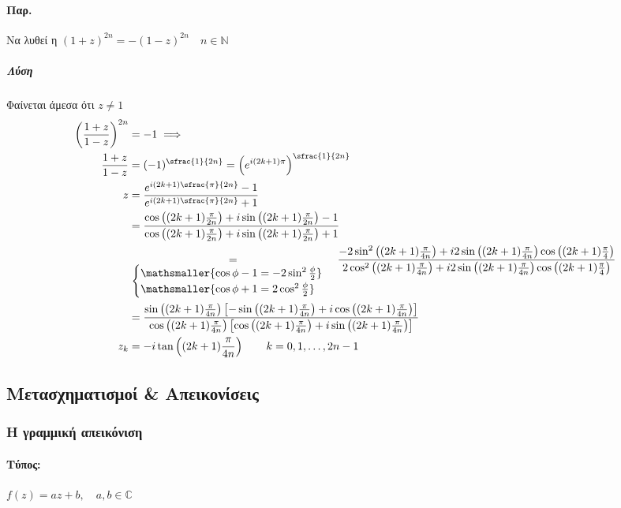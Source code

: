 \documentclass[12pt,a4paper,notitlepage,fleqn]{article}
\begin{document}
    \paragraph{Παρ.}
    Να λυθεί η \( (1+z)^{2n}=-(1-z)^{2n}\quad n\in\mathbb N \)
    \subparagraph{Λύση}
    Φαίνεται άμεσα ότι \( z\neq 1 \)
    \begin{align*}
    \left(
    \frac{1+z}{1-z}
    \right)^{2n}&=-1 \implies \\
    \frac{1+z}{1-z} &= (-1)^{\sfrac{1}{2n}}
    = \left(e^{i(2k+1)\pi}\right)^{\sfrac{1}{2n}}
    \\ z&=\frac{
    	e^{i(2k+1)\sfrac{\pi}{2n}}-1
    	}{e^{i(2k+1)\sfrac{\pi}{2n}}+1}
    \\ &= \frac{
    	\cos\left((2k+1)\frac{\pi}{2n}\right)+i\sin\left((2k+1)\frac{\pi}{2n}\right)-1
    	}{
    	\cos\left((2k+1)\frac{\pi}{2n}\right)+i\sin\left((2k+1)\frac{\pi}{2n}\right)+1
    	}
    \\ & \underset{\textstyle \begin{cases}
    	\mathsmaller{\cos\phi-1=-2\sin^2\frac{\phi}{2}}\\
    	\mathsmaller{\cos\phi+1=2\cos^2\frac{\phi}{2}}
    	\end{cases}}{=} \frac{-
    	2\sin^2\left( (2k+1)\frac{\pi}{4n} \right)+i2\sin\left((2k+1)\frac{\pi}{4n}\right)\cos\left(
    	(2k+1)\frac{\pi}{4}
    	\right)
    	}{2\cos^2\left( (2k+1)\frac{\pi}{4n} \right)+i2\sin\left((2k+1)\frac{\pi}{4n}\right)\cos\left(
    	(2k+1)\frac{\pi}{4}
    	\right)}
    \\ &= \frac{
    	\sin\left((2k+1)\frac{\pi}{4n}\right)\left[
    	-\sin\left(
    	(2k+1)\frac{\pi}{4n}
    	\right)+i\cos\left(
    	(2k+1)\frac{\pi}{4n}
    	\right)
    	\right]
    	}{\cos\left(
    	(2k+1)\frac{\pi}{4n}
    	\right)\left[
    	\cos\left((2k+1)\frac{\pi}{4n}\right)+i\sin\left(
    	(2k+1)\frac{\pi}{4n}
    	\right)
    	\right]}
    \\ z_k &= -i\tan\left((2k+1)\frac{\pi}{4n}\right) \qquad
    k=0,1,\dots,2n-1
    \end{align*}

    \subsection{Μετασχηματισμοί \& Απεικονίσεις}
    \subsubsection{Η γραμμική απεικόνιση}
    \paragraph{Τύπος:} \( f(z) = az+b,\quad a,b\in\mathbb C  \)
\end{document}
